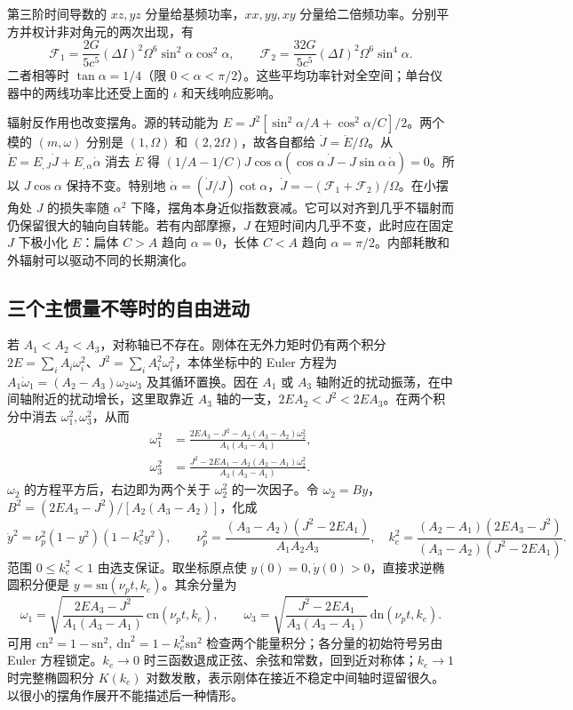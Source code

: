 第三阶时间导数的 $xz,yz$ 分量给基频功率，$xx,yy,xy$ 分量给二倍频功率。分别平方并权计非对角元的两次出现，有
\begin{equation}
 \mathcal F_1=\frac{2G}{5c^5}(\Delta I)^2\Omega^6\sin^2\alpha\cos^2\alpha,\qquad
 \mathcal F_2=\frac{32G}{5c^5}(\Delta I)^2\Omega^6\sin^4\alpha .
 \label{eq:gw-a-precessflux}
\end{equation}
二者相等时 $\tan\alpha=1/4$（限 $0<\alpha<\pi/2$）。这些平均功率针对全空间；单台仪器中的两线功率比还受上面的 $\iota$ 和天线响应影响。

辐射反作用也改变摆角。源的转动能为 $E=J^2[\sin^2\alpha/A+\cos^2\alpha/C]/2$。两个模的 $(m,\omega)$ 分别是 $(1,\Omega)$ 和 $(2,2\Omega)$，故各自都给 $\dot J=\dot E/\Omega$。从 $\dot E=E_{,J}\dot J+E_{,\alpha}\dot\alpha$ 消去 $\dot E$ 得 $(1/A-1/C)J\cos\alpha (\cos\alpha\,\dot J-J\sin\alpha\,\dot\alpha)=0$。所以 $J\cos\alpha$ 保持不变。特别地 $\dot\alpha=(\dot J/J)\cot\alpha$，$\dot J=-(\mathcal F_1+\mathcal F_2)/\Omega$。在小摆角处 $J$ 的损失率随 $\alpha^2$ 下降，摆角本身近似指数衰减。它可以对齐到几乎不辐射而仍保留很大的轴向自转能。若有内部摩擦，$J$ 在短时间内几乎不变，此时应在固定 $J$ 下极小化 $E$：扁体 $C>A$ 趋向 $\alpha=0$，长体 $C<A$ 趋向 $\alpha=\pi/2$。内部耗散和外辐射可以驱动不同的长期演化。

\subsection{三个主惯量不等时的自由进动}

若 $A_1<A_2<A_3$，对称轴已不存在。刚体在无外力矩时仍有两个积分 $2E=\sum_i A_i\omega_i^2$、$J^2=\sum_i A_i^2\omega_i^2$，本体坐标中的 Euler 方程为 $A_1\dot\omega_1=(A_2-A_3)\omega_2\omega_3$ 及其循环置换。因在 $A_1$ 或 $A_3$ 轴附近的扰动振荡，在中间轴附近的扰动增长，这里取靠近 $A_3$ 轴的一支，$2EA_2<J^2<2EA_3$。在两个积分中消去 $\omega_1^2,\omega_3^2$，从而
\begin{align*}
 \omega_1^2&=\frac{2EA_3-J^2-A_2(A_3-A_2)\omega_2^2}
                   {A_1(A_3-A_1)},\\
 \omega_3^2&=\frac{J^2-2EA_1-A_2(A_2-A_1)\omega_2^2}
                   {A_3(A_3-A_1)} .
\end{align*}
$\omega_2$ 的方程平方后，右边即为两个关于 $\omega_2^2$ 的一次因子。令 $\omega_2=B y$，$B^2=(2EA_3-J^2)/[A_2(A_3-A_2)]$，化成
\[
 \dot y^2=\nu_p^2(1-y^2)(1-k_e^2 y^2),\qquad
 \nu_p^2=\frac{(A_3-A_2)(J^2-2EA_1)}{A_1A_2A_3},\quad
 k_e^2=\frac{(A_2-A_1)(2EA_3-J^2)}{(A_3-A_2)(J^2-2EA_1)} .
\]
范围 $0\le k_e^2<1$ 由选支保证。取坐标原点使 $y(0)=0,\dot y(0)>0$，直接求逆椭圆积分便是 $y=\mathrm{sn}(\nu_p t,k_e)$。其余分量为
\[
 \omega_1=\sqrt{\frac{2EA_3-J^2}{A_1(A_3-A_1)}}\,\mathrm{cn}(\nu_pt,k_e),
 \qquad
 \omega_3=\sqrt{\frac{J^2-2EA_1}{A_3(A_3-A_1)}}\,\mathrm{dn}(\nu_pt,k_e).
\]
可用 $\mathrm{cn}^2=1-\mathrm{sn}^2,\ \mathrm{dn}^2=1-k_e^2\mathrm{sn}^2$ 检查两个能量积分；各分量的初始符号另由 Euler 方程锁定。$k_e\to0$ 时三函数退成正弦、余弦和常数，回到近对称体；$k_e\to1$ 时完整椭圆积分 $K(k_e)$ 对数发散，表示刚体在接近不稳定中间轴时逗留很久。以很小的摆角作展开不能描述后一种情形。

